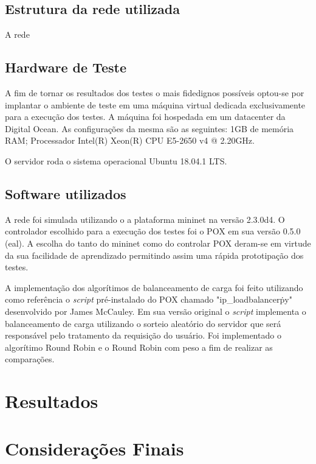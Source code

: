 \documentclass[12pt]{article}
\begin{document}
\subsection{Estrutura da rede utilizada}

A rede 

\subsection{Hardware de Teste}

A fim de tornar os resultados dos testes o mais fidedignos possíveis optou-se por implantar o ambiente de teste em uma máquina virtual dedicada exclusivamente para a execução dos testes. A máquina foi hospedada em um datacenter da Digital Ocean. As configurações da mesma são as seguintes: 1GB de memória RAM; Processador Intel(R) Xeon(R) CPU E5-2650 v4 @ 2.20GHz.

O servidor roda o sistema operacional Ubuntu 18.04.1 LTS. 

\subsection{Software utilizados}

A rede foi simulada utilizando o a plataforma mininet na versão 2.3.0d4. O controlador escolhido para a execução dos testes foi o POX em sua versão 0.5.0 (eal). A escolha do tanto do mininet como do controlar POX deram-se em virtude da sua facilidade de aprendizado permitindo assim uma rápida prototipação dos testes.

A implementação dos algorítimos de balanceamento de carga foi feito utilizando como referência o \textit{script} pré-instalado do POX chamado "ip\_loadbalancer\.py" desenvolvido por James McCauley. Em sua versão original o \textit{script} implementa o balanceamento de carga utilizando o sorteio aleatório do servidor que será responsável pelo tratamento da requisição do usuário. Foi implementado o algorítimo Round Robin e o Round Robin com peso a fim de realizar as comparações.

\section{Resultados}


\section{Considerações Finais}
\end{document}
